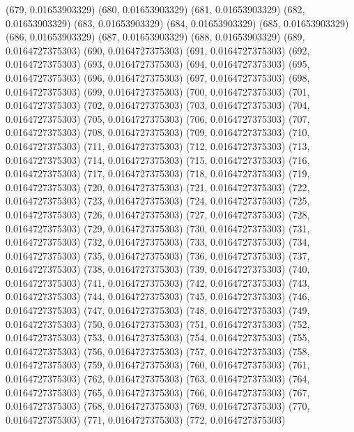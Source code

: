 {					(679, 0.01653903329)
					(680, 0.01653903329)
					(681, 0.01653903329)
					(682, 0.01653903329)
					(683, 0.01653903329)
					(684, 0.01653903329)
					(685, 0.01653903329)
					(686, 0.01653903329)
					(687, 0.01653903329)
					(688, 0.01653903329)
					(689, 0.0164727375303)
					(690, 0.0164727375303)
					(691, 0.0164727375303)
					(692, 0.0164727375303)
					(693, 0.0164727375303)
					(694, 0.0164727375303)
					(695, 0.0164727375303)
					(696, 0.0164727375303)
					(697, 0.0164727375303)
					(698, 0.0164727375303)
					(699, 0.0164727375303)
					(700, 0.0164727375303)
					(701, 0.0164727375303)
					(702, 0.0164727375303)
					(703, 0.0164727375303)
					(704, 0.0164727375303)
					(705, 0.0164727375303)
					(706, 0.0164727375303)
					(707, 0.0164727375303)
					(708, 0.0164727375303)
					(709, 0.0164727375303)
					(710, 0.0164727375303)
					(711, 0.0164727375303)
					(712, 0.0164727375303)
					(713, 0.0164727375303)
					(714, 0.0164727375303)
					(715, 0.0164727375303)
					(716, 0.0164727375303)
					(717, 0.0164727375303)
					(718, 0.0164727375303)
					(719, 0.0164727375303)
					(720, 0.0164727375303)
					(721, 0.0164727375303)
					(722, 0.0164727375303)
					(723, 0.0164727375303)
					(724, 0.0164727375303)
					(725, 0.0164727375303)
					(726, 0.0164727375303)
					(727, 0.0164727375303)
					(728, 0.0164727375303)
					(729, 0.0164727375303)
					(730, 0.0164727375303)
					(731, 0.0164727375303)
					(732, 0.0164727375303)
					(733, 0.0164727375303)
					(734, 0.0164727375303)
					(735, 0.0164727375303)
					(736, 0.0164727375303)
					(737, 0.0164727375303)
					(738, 0.0164727375303)
					(739, 0.0164727375303)
					(740, 0.0164727375303)
					(741, 0.0164727375303)
					(742, 0.0164727375303)
					(743, 0.0164727375303)
					(744, 0.0164727375303)
					(745, 0.0164727375303)
					(746, 0.0164727375303)
					(747, 0.0164727375303)
					(748, 0.0164727375303)
					(749, 0.0164727375303)
					(750, 0.0164727375303)
					(751, 0.0164727375303)
					(752, 0.0164727375303)
					(753, 0.0164727375303)
					(754, 0.0164727375303)
					(755, 0.0164727375303)
					(756, 0.0164727375303)
					(757, 0.0164727375303)
					(758, 0.0164727375303)
					(759, 0.0164727375303)
					(760, 0.0164727375303)
					(761, 0.0164727375303)
					(762, 0.0164727375303)
					(763, 0.0164727375303)
					(764, 0.0164727375303)
					(765, 0.0164727375303)
					(766, 0.0164727375303)
					(767, 0.0164727375303)
					(768, 0.0164727375303)
					(769, 0.0164727375303)
					(770, 0.0164727375303)
					(771, 0.0164727375303)
					(772, 0.0164727375303)
}
